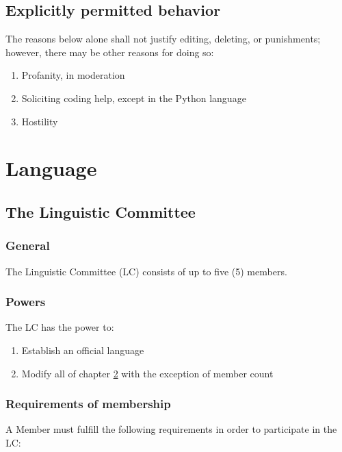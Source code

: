 \documentclass[10pt]{book}
\begin{document}
\section{Explicitly permitted behavior}
\label{permcon}

The reasons below alone shall not justify editing, deleting, or punishments; however, there may be other reasons for doing so:

\begin{enumerate}
 \item Profanity, in moderation
 \item Soliciting coding help, except in the Python language
 \item Hostility
\end{enumerate}

\chapter{Language}
\label{chapter:language}

\section{The Linguistic Committee}

\subsection{General}

The Linguistic Committee (LC) consists of up to five (5) members.

\subsection{Powers}

The LC has the power to:

\begin{enumerate}
 \item Establish an official language
 \item Modify all of chapter \ref{chapter:language} with the exception of member count
\end{enumerate}

\subsection{Requirements of membership}

A Member must fulfill the following requirements in order to participate in the LC:
\end{document}
